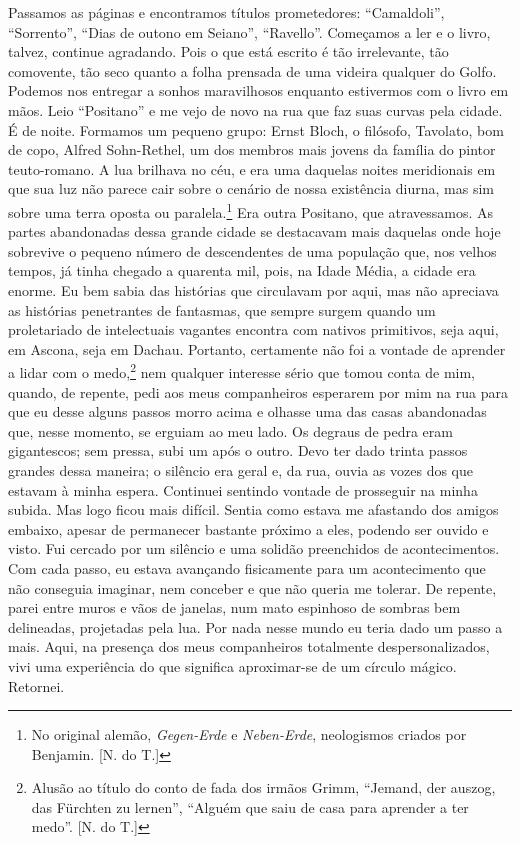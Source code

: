 Passamos as páginas e encontramos títulos prometedores: ``Camaldoli'',
``Sorrento'', ``Dias de outono em Seiano'', ``Ravello''. Começamos a ler
e o livro, talvez, continue agradando. Pois o que está escrito é tão
irrelevante, tão comovente, tão seco quanto a folha prensada de uma
videira qualquer do Golfo. Podemos nos entregar a sonhos maravilhosos
enquanto estivermos com o livro em mãos. Leio ``Positano'' e me vejo de
novo na rua que faz suas curvas pela cidade. É de noite. Formamos um
pequeno grupo: Ernst Bloch, o filósofo, Tavolato, bom de copo, Alfred
Sohn-Rethel, um dos membros mais jovens da família do pintor
teuto-romano. A lua brilhava no céu, e era uma daquelas noites
meridionais em que sua luz não parece cair sobre o cenário de nossa
existência diurna, mas sim sobre uma terra oposta ou paralela.\footnote{No
  original alemão, \emph{Gegen-Erde} e \emph{Neben-Erde}, neologismos
  criados por Benjamin. [N. do T.]} Era outra Positano, que
atravessamos. As partes abandonadas dessa grande cidade se destacavam
mais daquelas onde hoje sobrevive o pequeno número de descendentes de
uma população que, nos velhos tempos, já tinha chegado a quarenta mil,
pois, na Idade Média, a cidade era enorme. Eu bem sabia das histórias
que circulavam por aqui, mas não apreciava as histórias penetrantes de
fantasmas, que sempre surgem quando um proletariado de intelectuais
vagantes encontra com nativos primitivos, seja aqui, em Ascona, seja em
Dachau. Portanto, certamente não foi a vontade de aprender a lidar com o
medo,\footnote{Alusão ao título do conto de fada dos irmãos Grimm,
  ``Jemand, der auszog, das Fürchten zu lernen'', ``Alguém que saiu de
  casa para aprender a ter medo''. [N. do T.]} nem qualquer
interesse sério que tomou conta de mim, quando, de repente, pedi aos
meus companheiros esperarem por mim na rua para que eu desse alguns
passos morro acima e olhasse uma das casas abandonadas que, nesse
momento, se erguiam ao meu lado. Os degraus de pedra eram gigantescos;
sem pressa, subi um após o outro. Devo ter dado trinta passos grandes
dessa maneira; o silêncio era geral e, da rua, ouvia as vozes dos que
estavam à minha espera. Continuei sentindo vontade de prosseguir na
minha subida. Mas logo ficou mais difícil. Sentia como estava me
afastando dos amigos embaixo, apesar de permanecer bastante próximo a
eles, podendo ser ouvido e visto. Fui cercado por um silêncio e uma
solidão preenchidos de acontecimentos. Com cada passo, eu estava
avançando fisicamente para um acontecimento que não conseguia imaginar,
nem conceber e que não queria me tolerar. De repente, parei entre muros
e vãos de janelas, num mato espinhoso de sombras bem delineadas,
projetadas pela lua. Por nada nesse mundo eu teria dado um passo a mais.
Aqui, na presença dos meus companheiros totalmente despersonalizados,
vivi uma experiência do que significa aproximar-se de um círculo mágico.
Retornei.


